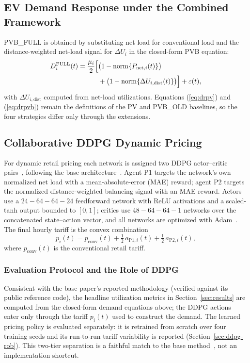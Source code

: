 \documentclass[10pt,journal]{IEEEtran}
\newcommand{\D}{\Delta}
\newcommand{\norm}[1]{\mathrm{norm}\{#1\}}
\begin{document}
\subsection{EV Demand Response under the Combined Framework}
PVB\_FULL is obtained by substituting net load for conventional load and the
distance-weighted net-load signal for $\D U_i$ in the closed-form PVB
equation:
\begin{equation}\label{eq:full}
\begin{aligned}
D_i^{\mathrm{FULL}}(t)=\frac{\mu_i}{2}\Bigl[&
  \bigl(1-\norm{P_{\mathrm{net},i}(t)}\bigr)\\
  &+{\bigl(1-\norm{\D U_{i,\mathrm{dist}}(t)}\bigr)}\Bigr]
  +\varepsilon(t),
\end{aligned}
\end{equation}
with $\D U_{i,\mathrm{dist}}$ computed from net-load utilizations.
Equations (\ref{eq:drpv}) and (\ref{eq:drpvb}) remain the definitions of the
PV and PVB\_OLD baselines, so the four strategies differ only through the
extensions.

\subsection{Collaborative DDPG Dynamic Pricing}\label{sec:framework-ddpg}
For dynamic retail pricing each network is assigned two DDPG
actor--critic pairs~\cite{lillicrap2016}, following the base
architecture~\cite{lepolesa2026}. Agent P1 targets the network's own
normalized net load with a mean-absolute-error (MAE) reward; agent P2
targets the normalized distance-weighted balancing signal with an MAE
reward. Actors use a $24{-}64{-}64{-}24$ feedforward network with ReLU
activations and a scaled-tanh output bounded to $[0,1]$; critics use
$48{-}64{-}64{-}1$ networks over the concatenated state--action vector, and
all networks are optimized with Adam~\cite{kingma2015}. The final hourly
tariff is the convex combination
\begin{equation}\label{eq:price}
  p_i(t)=p_{\mathrm{conv}}(t)
       +\tfrac12\,a_{\mathrm{P1},i}(t)
       +\tfrac12\,a_{\mathrm{P2},i}(t),
\end{equation}
where $p_{\mathrm{conv}}(t)$ is the conventional retail tariff.

\subsubsection*{Evaluation Protocol and the Role of DDPG}
Consistent with the base paper's reported methodology (verified against its
public reference code), the headline utilization metrics in
Section~\ref{sec:results} are computed from the closed-form demand equations
above; the DDPG actions enter only through the tariff $p_i(t)$ used to
construct the demand. The learned pricing policy is evaluated separately: it
is retrained from scratch over four training seeds and its run-to-run
tariff variability is reported (Section~\ref{sec:ddpg-rob}). This two-tier
separation is a faithful match to the base method~\cite{lepolesa2026}, not an
implementation shortcut.
\end{document}
